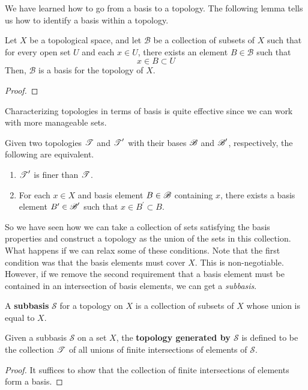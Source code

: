   We have learned how to go from a basis to a topology. The following lemma tells us how to identify a basis within a topology. 

  \begin{theorem}
    Let $X$ be a topological space, and let $\mathscr{B}$ be a collection of subsets of $X$ such that for every open set $U$ and each $x \in U$, there exists an element $B \in \mathscr{B}$ such that
    \begin{equation}
      x \in B \subset U
    \end{equation}
    Then, $\mathscr{B}$ is a basis for the topology of $X$. 
  \end{theorem}
  \begin{proof}
    
  \end{proof} 

  Characterizing topologies in terms of basis is quite effective since we can work with more manageable sets. 

  \begin{lemma}
    Given two topologies $\operatorname{\mathscr{T}}$ and $\operatorname{\mathscr{T}}^\prime$ with their bases $\operatorname{\mathscr{B}}$ and $\operatorname{\mathscr{B}}^\prime$, respectively, the following are equivalent. 
    \begin{enumerate}
      \item $\operatorname{\mathscr{T}}^\prime$ is finer than $\operatorname{\mathscr{T}}$. 
      \item For each $x \in X$ and basis element $B \in \operatorname{\mathscr{B}}$ containing $x$, there exists a basis element $B^\prime \in \operatorname{\mathscr{B}}^\prime$ such that $x \in B^\prime \subset B$. 
    \end{enumerate}
  \end{lemma}

  So we have seen how we can take a collection of sets satisfying the basis properties and construct a topology as the union of the sets in this collection. What happens if we can relax some of these conditions. Note that the first condition was that the basis elements must cover $X$. This is non-negotiable. However, if we remove the second requirement that a basis element must be contained in an intersection of basis elements, we can get a \textit{subbasis}. 

  \begin{definition}[Subbasis]
    A \textbf{subbasis} $\mathscr{S}$ for a topology on $X$ is a collection of subsets of $X$ whose union is equal to $X$. 
  \end{definition}

  \begin{theorem}
    Given a subbasis $\mathscr{S}$ on a set $X$, the \textbf{topology generated by $\mathscr{S}$} is defined to be the collection $\operatorname{\mathscr{T}}$ of all unions of finite intersections of elements of $\mathscr{S}$. 
  \end{theorem}
  \begin{proof}
    It suffices to show that the collection of finite intersections of elements form a basis. 
  \end{proof}
 
